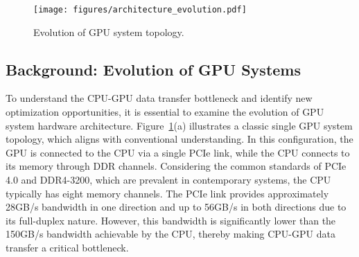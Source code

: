 
\begin{figure}
    \centering
    \texttt{[image: figures/architecture\_evolution.pdf]}
    \caption{Evolution of GPU system topology.}
    \label{fig:gpu-sys-arch}
\end{figure}

\subsection{Background: Evolution of GPU Systems}
To understand the CPU-GPU data transfer bottleneck and identify new optimization opportunities, it is essential to examine the evolution of GPU system hardware architecture. 
Figure~\ref{fig:gpu-sys-arch}(a) illustrates a classic single GPU system topology, which aligns with conventional understanding. 
In this configuration, the GPU is connected to the CPU via a single PCIe link, while the CPU connects to its memory through DDR channels. 
Considering the common standards of PCIe 4.0 and DDR4-3200, which are prevalent in contemporary systems, the CPU typically has eight memory channels. 
The PCIe link provides approximately 28GB/s bandwidth in one direction and up to 56GB/s in both directions due to its full-duplex nature. 
However, this bandwidth is significantly lower than the 150GB/s bandwidth achievable by the CPU, thereby making CPU-GPU data transfer a critical bottleneck.

\begin{comment}
To understand the CPU-GPU data transfer bottleneck and uncover new optimization opportunities, we first describe how the hardware architecture of GPU systems has evolved.
Figure~\ref{fig:gpu-sys-arch}(a) shows a classic single GPU system topology that matches the conventional wisdom.
Here, the GPU connects to the CPU with a single PCIe link; the CPU connects to the memory through DDR channels.
Assuming common standards of PCIe 4.0 and DDR4-3200, widespread in systems today, CPU has 8 memory channels.
The PCIe link can deliver about 28GB/s bandwidth in one direction and 56GB/s bandwidth if there is traffic in both directions, due to its full-duplex property.
This is far less than 150GB/s bandwidth the CPU can achieve, making CPU-GPU data transfer a bottleneck.
\end{comment}

